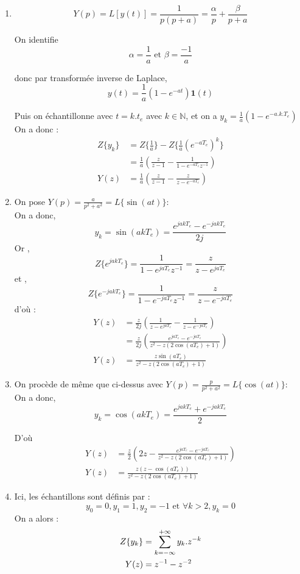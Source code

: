 \documentclass[../main.tex]{subfiles}
\begin{document}
\begin{enumerate}
\item \[Y(p)= L[y(t)] = \frac{1}{p(p+a)} = \frac{\alpha}{p}+\frac{\beta}{p+a}\]

On identifie \[\alpha=\frac{1}{a} \text{ et } \beta=\frac{-1}{a} \]

donc par transformée inverse de Laplace, \[y(t)=\frac{1}{a}(1-e^{-at})\mathbf{1}(t)\]

Puis on échantillonne avec $t=k.t_e$ avec $k \in\mathbb{N}$, et on a $y_k=\frac{1}{a}(1-e^{-a.k.T_e})$\\
On a donc :
\begin{align*}
Z\{y_k\} &= Z\{\frac{1}{a}\} - Z\{\frac{1}{a}(e^{-aT_e})^k\}\\
&= \frac{1}{a}(\frac{z}{z-1}-\frac{1}{1-e^{-aT_e}z^{-1}})\\
Y(z) &= \frac{1}{a}(\frac{z}{z-1}-\frac{z}{z-e^{-aT_e}})
\end{align*}

\item On pose $Y(p)= \frac{a}{p^2+a^2} = L\{\sin(at)\}$:\\
On a donc, \[y_k=\sin(akT_e) = \frac{e^{jakT_e}-e^{-jakT_e}}{2j}\]
Or , \[Z\{e^{jakT_e}\}=\frac{1}{1-e^{jaT_e}z^{-1}}=\frac{z}{z-e^{jaT_e}}\]
et , \[Z\{e^{-jakT_e}\}=\frac{1}{1-e^{-jaT_e}z^{-1}}=\frac{z}{z-e^{-jaT_e}}\]
d'où :
\begin{align*}
Y(z) &= \frac{z}{2j}(\frac{1}{z-e^{jaT_e}}-\frac{1}{z-e^{-jaT_e}})\\
&=\frac{z}{2j}(\frac{e^{jaT_e}-e^{-jaT_e}}{z^2-z(2\cos(aT_e)+1)})\\
Y(z) &=\frac{z\sin(aT_e)}{z^2-z(2\cos(aT_e)+1)}
\end{align*}

\item On procède de même que ci-dessus avec $Y(p)= \frac{p}{p^2+a^2} = L\{\cos(at)\}$:\\
On a donc, \[y_k=\cos(akT_e) = \frac{e^{jakT_e}+e^{-jakT_e}}{2}\]

D'où
\begin{align*}
Y(z) &=\frac{z}{2}(2z-\frac{e^{jaT_e}-e^{-jaT_e}}{z^2-z(2\cos(aT_e)+1)}) \\
Y(z) &=\frac{z(z-\cos(aT_e))}{z^2-z(2\cos(aT_e)+1)}
\end{align*}

\item Ici, les échantillons sont définis par :
\[y_0=0 ,y_1=1, y_2=-1 \text{ et } \forall k > 2, y_k=0\]
On a alors :
\begin{align*}
Z\{y_k\} &= \sum_{k=-\infty}^{+\infty} y_k.z^{-k}\\
Y(z) &= z^{-1} - z^{-2}
\end{align*}


\end{enumerate}
\end{document}
